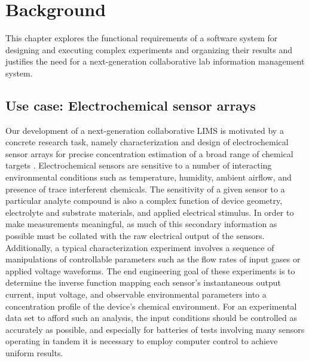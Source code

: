 \documentclass[../thesis]{subfiles}
\begin{document}
\chapter{Background}

This chapter explores the functional requirements of a software
system for designing and executing complex experiments and organizing
their results and justifies the need for a next-generation
collaborative lab information management system. %



\section{Use case: Electrochemical sensor arrays}

Our development of a next-generation collaborative LIMS is motivated
by a concrete research task, namely characterization and design of
electrochemical sensor arrays for precise concentration estimation of
a broad range of chemical targets \cite{Li2014, Wang2016,
  Wang2014}. Electrochemical sensors are sensitive to a number of
interacting environmental conditions such as temperature, humidity,
ambient airflow, and presence of trace interferent chemicals. The
sensitivity of a given sensor to a particular analyte compound is also
a complex function of device geometry, electrolyte and substrate
materials, and applied electrical stimulus. In order to make
measurements meaningful, as much of this secondary information as
possible must be collated with the raw electrical output of the
sensors. Additionally, a typical characterization experiment involves
a sequence of manipulations of controllable parameters such as the
flow rates of input gases or applied voltage waveforms. The end
engineering goal of these experiments is to determine the inverse
function mapping each sensor's instantaneous output current, input
voltage, and observable environmental parameters into a concentration
profile of the device's chemical environment. For an experimental data
set to afford such an analysis, the input conditions should be
controlled as accurately as possible, and especially for batteries of
tests involving many sensors operating in tandem it is necessary to
employ computer control to achieve uniform results.
\end{document}
